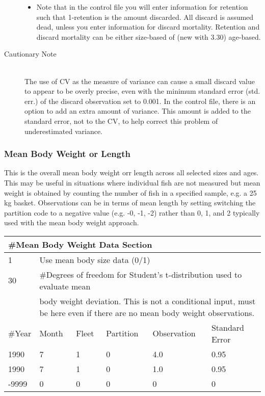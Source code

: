 \begin{description}
\begin{itemize}
		\item Note that in the control file you will enter information for retention such that 1-retention is the amount discarded.  All discard is assumed dead, unless you enter information for discard mortality.  Retention and discard mortality can be either size-based of (new with 3.30) age-based.
	\end{itemize}
	\item[Cautionary Note]\hfill\\
	The use of CV as the measure of variance can cause a small discard value to appear to be overly precise, even with the minimum standard error (std. err.) of the discard observation set to 0.001.  In the control file, there is an option to add an extra amount of variance.  This amount is added to the standard error, not to the CV, to help correct this problem of underestimated variance.
\end{description}

\subsubsection{Mean Body Weight or Length}
This is the overall mean body weight orr length across all selected sizes and ages.  This may be useful in situations where individual fish are not measured but mean weight is obtained by counting the number of fish in a specified sample, e.g. a 25 kg basket.  Observations can be  in terms of mean length by setting switching the partition code to a negative value (e.g. -0, -1, -2) rather than 0, 1, and 2 typically used with the mean body weight approach.

\begin{center}
	\begin{tabular}{p{2cm} p{2cm} p{2cm} p{2cm} p{2cm} p{2cm}}
		\multicolumn{6}{l}{\#Mean Body Weight Data Section}\\
		\hline
		1  & \multicolumn{5}{l}{Use mean body size data (0/1) } \\
		\hline
		30 & \multicolumn{5}{l}{\#Degrees of freedom for Student's t-distribution used to evaluate mean } \\
		   & \multicolumn{5}{l}{\parbox{13cm }{ body weight deviation.  This is not a conditional input, must be here even if there are no mean body weight observations.}}\\
		\hline
		\#Year & Month & Fleet & Partition & Observation & Standard Error \\
		\hline
		1990  & 7 & 1 & 0 & 4.0 & 0.95 \\
		1990  & 7 & 1 & 0 & 1.0 & 0.95 \\
		-9999 & 0 & 0 & 0 & 0   & 0 \\
		\hline
	\end{tabular}
\end{center}

